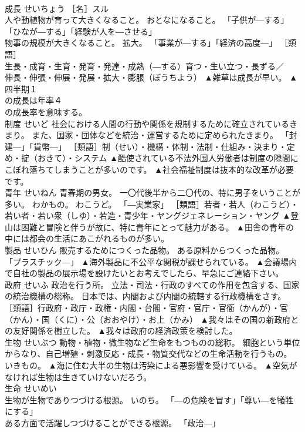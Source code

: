 \documentclass[8pt]{extreport}
\begin{document}
\begin{CJK}{UTF8}{min}
\\	成長	せいちょう	［名］スル 
\\	人や動植物が育って大きくなること。 おとなになること。 「子供が―する」「ひなが―する」「経験が人を―させる」 
\\	物事の規模が大きくなること。 拡大。 「事業が―する」「経済の高度―」 ［類語］
\\	生長・成育・生育・発育・発達・成熟（―する）育つ・生い立つ・長ずる／
\\	伸長・伸張・伸展・発展・拡大・膨脹（ぼうちよう）	▲雑草は成長が早い。 ▲四半期１
\\	の成長は年率４
\\	の成長率を意味する。
\\	制度	せいど	社会における人間の行動や関係を規制するために確立されているきまり。 また、国家・団体などを統治・運営するために定められたきまり。 「封建―」「貨幣―」 ［類語］制（せい）・機構・体制・法制・仕組み・決まり・定め・掟（おきて）・システム	▲酷使されている不法外国人労働者は制度の隙間にこぼれ落ちてしまうことが多いのです。 ▲社会福祉制度は抜本的な改革が必要です。
\\	青年	せいねん	青春期の男女。 一〇代後半から二〇代の、特に男子をいうことが多い。 わかもの。 わこうど。 「―実業家」 ［類語］若者・若人（わこうど）・若い者・若い衆（しゆ）・若造・青少年・ヤングジェネレーション・ヤング	▲登山は困難と冒険と伴うが故に、特に青年にとって魅力がある。 ▲田舎の青年の中には都会の生活にあこがれるものが多い。
\\	製品	せいひん	販売するためにつくった品物。 ある原料からつくった品物。 「プラスチック―」	▲海外製品に不公平な関税が課せられている。 ▲会議場内で自社の製品の展示場を設けたいとお考えでしたら、早急にご連絡下さい。
\\	政府	せいふ	政治を行う所。 立法・司法・行政のすべての作用を包含する、国家の統治機構の総称。 日本では、内閣および内閣の統轄する行政機構をさす。 ［類語］行政府・政庁・政権・内閣・台閣・官府・官庁・官衙（かんが）・官（かん）・国（くに）・公（おおやけ）・お上（かみ）	▲我々はその国の新政府との友好関係を樹立した。 ▲我々は政府の経済政策を検討した。
\\	生物	せいぶつ	動物・植物・微生物など生命をもつものの総称。 細胞という単位からなり、自己増殖・刺激反応・成長・物質交代などの生命活動を行うもの。 いきもの。	▲海に住む大半の生物は汚染による悪影響を受けている。 ▲空気がなければ生物は生きていけないだろう。
\\	生命	せいめい	
\\	生物が生物でありつづける根源。 いのち。 「―の危険を冒す」「尊い―を犠牲にする」 
\\	ある方面で活躍しつづけることができる根源。 「政治―」 

\end{CJK}
\end{document}
